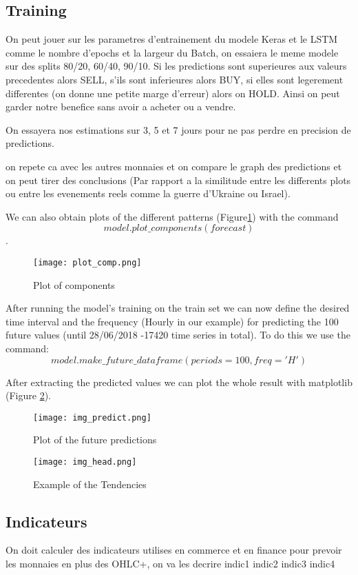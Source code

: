 \documentclass[10pt]{article}
\begin{document}
\begin{multicols}{2}
\subsection{Training}

On peut jouer sur les parametres d'entrainement du modele Keras et le LSTM comme le nombre d'epochs et la largeur du Batch, on essaiera le meme modele sur des splits 80/20, 60/40, 90/10.
Si les predictions sont superieures aux valeurs precedentes alors SELL, s'ils sont inferieures alors BUY, si elles sont legerement differentes (on donne une petite marge d'erreur) alors on HOLD.
Ainsi on peut garder notre benefice sans avoir a acheter ou a vendre.

On essayera nos estimations sur 3, 5 et 7 jours pour ne pas perdre en precision de predictions.

on repete ca avec les autres monnaies et on compare le graph des predictions et on peut tirer des conclusions (Par rapport a la similitude entre les differents plots ou entre les evenements reels comme la guerre d'Ukraine ou Israel).




We can also obtain plots of the different patterns (Figure\ref{f4}) with the command $$model.plot\_components(forecast)$$ .
\begin{figure}[H]
\centering
\texttt{[image: plot\_comp.png]}
\caption{Plot of components}
\label{f4}
\end{figure}

After running the model's training on the train set we can now define the desired time interval and the frequency (Hourly in our example) for predicting the 100 future values (until 28/06/2018 -17420 time series in total). \newline
To do this we use the command: $$model.make\_future\_dataframe(periods=100, freq='H')$$

After extracting the predicted values we can plot the whole result with matplotlib (Figure \ref{f5}).

\begin{figure}[H]
\centering
\texttt{[image: img\_predict.png]}
\caption{Plot of the future predictions}
\label{f5}
\end{figure}

\begin{figure}[H]
\centering
\texttt{[image: img\_head.png]}
\caption{Example of the Tendencies}
\label{f3}
\end{figure}
\subsection{Indicateurs}
On doit calculer des indicateurs utilises en commerce et en finance pour prevoir les monnaies en plus des OHLC+, on va les decrire
indic1
indic2
indic3
indic4



\end{multicols}
\end{document}
